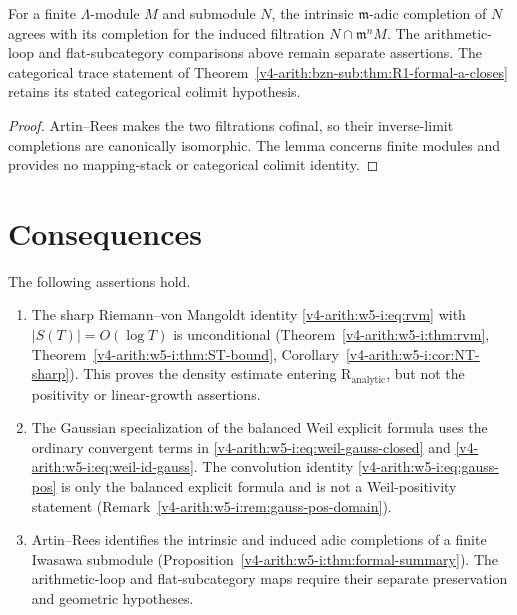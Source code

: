 \begin{proposition}
\label{v4-arith:w5-i:thm:formal-summary}
For a finite \(\Lambda\)-module \(M\) and submodule \(N\), the
intrinsic \(\mathfrak m\)-adic completion of \(N\) agrees with its
completion for the induced filtration \(N\cap\mathfrak m^nM\).
The arithmetic-loop and flat-subcategory comparisons above remain
separate assertions. The categorical trace statement of
Theorem~\ref{v4-arith:bzn-sub:thm:R1-formal-a-closes} retains its stated
categorical colimit hypothesis.
\end{proposition}
\begin{proof}
Artin--Rees makes the two filtrations cofinal, so their inverse-limit
completions are canonically isomorphic. The lemma concerns finite
modules and provides no mapping-stack or categorical colimit identity.
\end{proof}

\section{Consequences}
\label{v4-arith:w5-i:summary}

\begin{proposition}
\label{v4-arith:w5-i:prop:three-exact-inputs}

The following assertions hold.

\begin{enumerate}
\item The sharp Riemann--von Mangoldt identity
\eqref{v4-arith:w5-i:eq:rvm} with \(|S(T)|=O(\log T)\) is
unconditional
(Theorem~\ref{v4-arith:w5-i:thm:rvm},
Theorem~\ref{v4-arith:w5-i:thm:ST-bound},
Corollary~\ref{v4-arith:w5-i:cor:NT-sharp}). This proves the density estimate
entering \(\mathrm{R}_{\mathrm{analytic}}\), but not the positivity or
linear-growth assertions.
\item The Gaussian specialization of the balanced Weil explicit formula
uses the ordinary convergent terms in
\eqref{v4-arith:w5-i:eq:weil-gauss-closed} and
\eqref{v4-arith:w5-i:eq:weil-id-gauss}. The convolution
identity \eqref{v4-arith:w5-i:eq:gauss-pos} is only the balanced
explicit formula and is not a Weil-positivity statement
(Remark~\ref{v4-arith:w5-i:rem:gauss-pos-domain}).
\item Artin--Rees identifies the intrinsic and induced adic
completions of a finite Iwasawa submodule
(Proposition~\ref{v4-arith:w5-i:thm:formal-summary}).
The arithmetic-loop and flat-subcategory maps require their
separate preservation and geometric hypotheses.
\end{enumerate}
\end{proposition}

